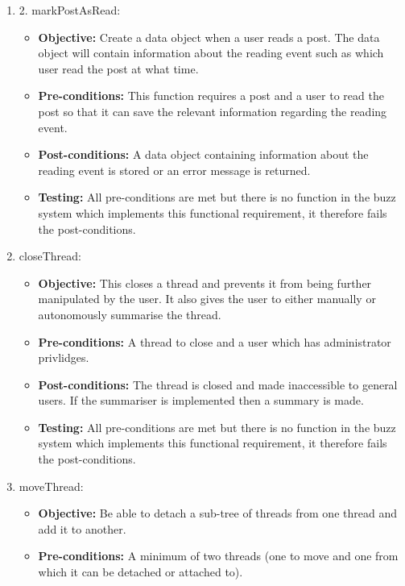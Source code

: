 \begin{enumerate}
\item 2.	markPostAsRead:
	\begin{itemize}
		\item\textbf{Objective: } Create a data object when a user reads a post. The data object will contain information about the reading event such as which user read the post at what time.
		\item\textbf{Pre-conditions: } This function requires a post and a user to read the post so that it can save the relevant information regarding the reading event.
		\item\textbf{Post-conditions: } A data object containing information about the reading event is stored or an error message is returned.
		\item\textbf{Testing: } All pre-conditions are met but there is no function in the buzz system which implements this functional requirement, it therefore fails the post-conditions.
	\end{itemize}
\item closeThread:
	\begin{itemize}
		\item\textbf{Objective: }This closes a thread and prevents it from being further manipulated by the user. It also gives the user to either manually or autonomously summarise the thread.
		\item\textbf{Pre-conditions: } A thread to close and a user which has administrator privlidges.
		\item\textbf{Post-conditions: } The thread is closed and made inaccessible  to general users. If the summariser is implemented then a summary is made.
		\item\textbf{Testing: } All pre-conditions are met but there is no function in the buzz system which implements this functional requirement, it therefore fails the post-conditions.
	\end{itemize}
\item moveThread:
	\begin{itemize}
		\item\textbf{Objective: }  Be able to detach a sub-tree of threads from one thread and add it to another.
		\item\textbf{Pre-conditions: } A minimum of two threads (one to move and one from which it can be detached or attached to).

\end{itemize}
\end{enumerate}
